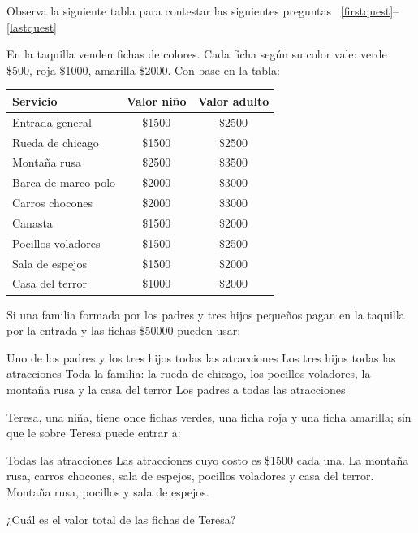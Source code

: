 \documentclass[10pt,letterpaper,addpoints]{exam}
\begin{document}
\begin{multicols}{2}
Observa la siguiente tabla para contestar las siguientes preguntas ~\ref{firstquest}--\ref{lastquest}

En la taquilla venden fichas de colores. Cada ficha según su color vale: verde \$500, roja \$1000, amarilla \$2000. Con base en la tabla:
\begin{center}
\begin{tabular}{|l|c|c|}
\hline 
Servicio & Valor niño & Valor adulto \\ 
\hline 
Entrada general & \$1500 & \$2500 \\ 
\hline 
Rueda de chicago & \$1500 & \$2500 \\ 
\hline 
Montaña rusa & \$2500 & \$3500 \\ 
\hline 
Barca de marco polo & \$2000 & \$3000 \\ 
\hline 
Carros chocones & \$2000 & \$3000 \\ 
\hline 
Canasta & \$1500 & \$2000 \\ 
\hline 
Pocillos voladores & \$1500 & \$2500 \\ 
\hline 
Sala de espejos & \$1500 & \$2000 \\ 
\hline 
Casa del terror & \$1000 & \$2000 \\ 
\hline 
\end{tabular}
\end{center}
\begin{questions}
\question \label{firstquest}
Si una familia formada por los padres y tres hijos pequeños pagan en la taquilla por la entrada y las fichas \$50000 pueden usar:
\begin{choices}
\choice Uno de los padres y los tres hijos todas las atracciones
\choice Los tres hijos todas las atracciones
\CorrectChoice Toda la familia: la rueda de chicago, los pocillos voladores, la montaña rusa y la casa del terror
\choice Los padres a todas las atracciones
\end{choices}
\question
Teresa, una niña, tiene once fichas verdes, una ficha roja y una ficha amarilla; sin que le sobre Teresa puede entrar a:
\begin{choices}
\choice Todas las atracciones
\choice Las atracciones cuyo costo es \$1500 cada una.
\CorrectChoice La montaña rusa, carros chocones, sala de espejos, pocillos voladores y casa del terror.
\choice Montaña rusa, pocillos y sala de espejos.
\end{choices}
\question
¿Cuál es el valor total de las fichas de Teresa?


\end{questions}
\end{multicols}
\end{document}
